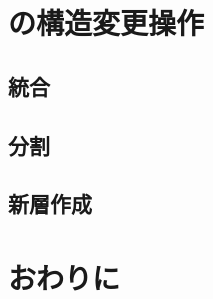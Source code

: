 \section{\Bcforest{}の構造変更操作}
\label{sec:smo}

\subsection{統合}
\subsection{分割}
\subsection{新層作成}

\section{おわりに}
\label{sec:conclusion}

